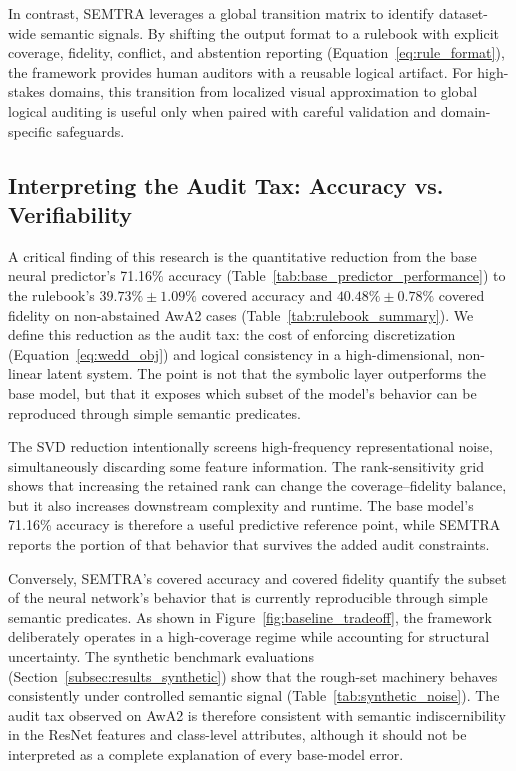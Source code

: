 \documentclass[make,article,submit,pdftex,moreauthors]{Definitions/mdpi}
\begin{document}
In contrast, SEMTRA leverages a global transition matrix to identify dataset-wide semantic signals. By shifting the output format to a rulebook with explicit coverage, fidelity, conflict, and abstention reporting (Equation~\eqref{eq:rule_format}), the framework provides human auditors with a reusable logical artifact. For high-stakes domains, this transition from localized visual approximation to global logical auditing is useful only when paired with careful validation and domain-specific safeguards.

\subsection{Interpreting the Audit Tax: Accuracy vs. Verifiability}
\label{subsec:interpreting_tax}

A critical finding of this research is the quantitative reduction from the base neural predictor's 71.16\% accuracy (Table~\ref{tab:base_predictor_performance}) to the rulebook's $39.73\% \pm 1.09\%$ covered accuracy and $40.48\% \pm 0.78\%$ covered fidelity on non-abstained AwA2 cases (Table~\ref{tab:rulebook_summary}). We define this reduction as the audit tax: the cost of enforcing discretization (Equation~\eqref{eq:wedd_obj}) and logical consistency in a high-dimensional, non-linear latent system. The point is not that the symbolic layer outperforms the base model, but that it exposes which subset of the model's behavior can be reproduced through simple semantic predicates.

The SVD reduction intentionally screens high-frequency representational noise, simultaneously discarding some feature information. The rank-sensitivity grid shows that increasing the retained rank can change the coverage--fidelity balance, but it also increases downstream complexity and runtime. The base model's 71.16\% accuracy is therefore a useful predictive reference point, while SEMTRA reports the portion of that behavior that survives the added audit constraints.

Conversely, SEMTRA's covered accuracy and covered fidelity quantify the subset of the neural network's behavior that is currently reproducible through simple semantic predicates. As shown in Figure~\ref{fig:baseline_tradeoff}, the framework deliberately operates in a high-coverage regime while accounting for structural uncertainty. The synthetic benchmark evaluations (Section~\ref{subsec:results_synthetic}) show that the rough-set machinery behaves consistently under controlled semantic signal (Table~\ref{tab:synthetic_noise}). The audit tax observed on AwA2 is therefore consistent with semantic indiscernibility in the ResNet features and class-level attributes, although it should not be interpreted as a complete explanation of every base-model error.
\end{document}
